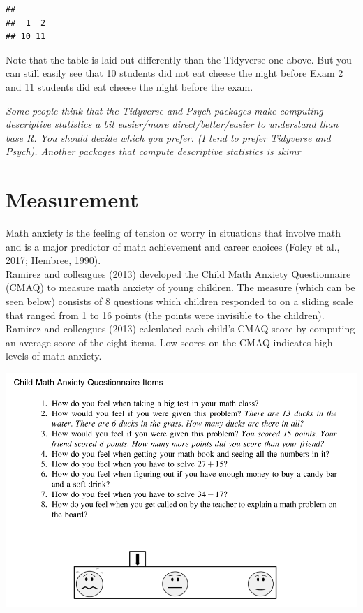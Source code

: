 \documentclass[
]{book}
\begin{document}
\begin{verbatim}
## 
##  1  2 
## 10 11
\end{verbatim}

Note that the table is laid out differently than the Tidyverse one above. But you can still easily see that 10 students did not eat cheese the night before Exam 2 and 11 students did eat cheese the night before the exam.

\emph{Some people think that the Tidyverse and Psych packages make computing descriptive statistics a bit easier/more direct/better/easier to understand than base R. You should decide which you prefer. (I tend to prefer Tidyverse and Psych). Another packages that compute descriptive statistics is skimr }

\hypertarget{measurement}{%
\chapter{Measurement}\label{measurement}}

Math anxiety is the feeling of tension or worry in situations that involve math and is a major predictor of math achievement and career choices (Foley et al., 2017; Hembree, 1990).\\
\href{https://drive.google.com/file/d/1VvSqWL7W4mvA5MtDAF94GclVIemC_a9P/view?usp=sharing}{Ramirez and colleagues (2013)} developed the Child Math Anxiety Questionnaire (CMAQ) to measure math anxiety of young children. The measure (which can be seen below) consists of 8 questions which children responded to on a sliding scale that ranged from 1 to 16 points (the points were invisible to the children). Ramirez and colleagues (2013) calculated each child's CMAQ score by computing an average score of the eight items. Low scores on the CMAQ indicates high levels of math anxiety.

\includegraphics{img/cmaq.png}
\end{document}
